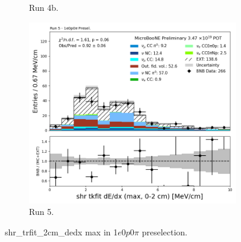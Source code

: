 \begin{figure}[H]
\begin{subfigure}[t]{0.32\linewidth}
        \caption{Run 4b.}
    \end{subfigure}%
    \hspace{0.2cm}%
    \begin{subfigure}[t]{0.32\linewidth}
        \includegraphics[width=\linewidth]{technote/Appendix_Preselection/Figures/1e0p0pi/Run5/shr_tkfit_2cm_dedx_max_Run5_1e0p0pi_Presel.png}
        \caption{Run 5.}
    \end{subfigure}
    \caption{shr\_trfit\_2cm\_dedx max in 1$e$0$p$0$\pi$ preselection.}
\end{figure}


